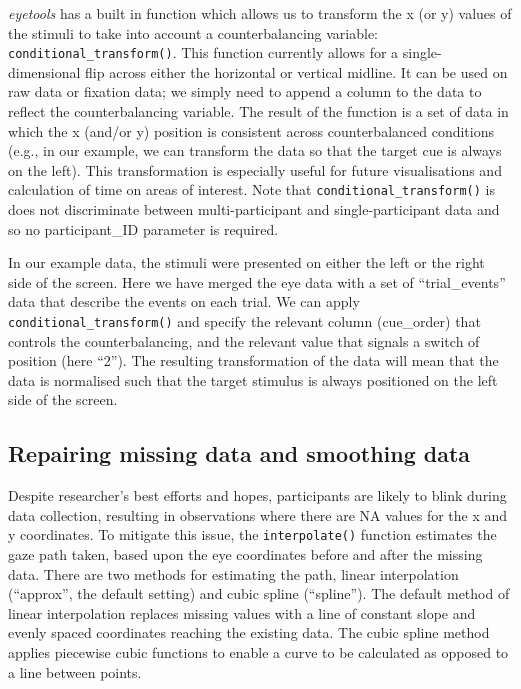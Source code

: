\documentclass[
  man,
  floatsintext,
  longtable,
  nolmodern,
  notxfonts,
  notimes,
  colorlinks=true,linkcolor=blue,citecolor=blue,urlcolor=blue]{apa7}
\begin{document}
\emph{eyetools} has a built in function which allows us to transform the
x (or y) values of the stimuli to take into account a counterbalancing
variable: \texttt{conditional\_transform()}. This function currently
allows for a single-dimensional flip across either the horizontal or
vertical midline. It can be used on raw data or fixation data; we simply
need to append a column to the data to reflect the counterbalancing
variable. The result of the function is a set of data in which the x
(and/or y) position is consistent across counterbalanced conditions
(e.g., in our example, we can transform the data so that the target cue
is always on the left). This transformation is especially useful for
future visualisations and calculation of time on areas of interest. Note
that \texttt{conditional\_transform()} is does not discriminate between
multi-participant and single-participant data and so no participant\_ID
parameter is required.

In our example data, the stimuli were presented on either the left or
the right side of the screen. Here we have merged the eye data with a
set of ``trial\_events'' data that describe the events on each trial. We
can apply \texttt{conditional\_transform()} and specify the relevant
column (cue\_order) that controls the counterbalancing, and the relevant
value that signals a switch of position (here ``2''). The resulting
transformation of the data will mean that the data is normalised such
that the target stimulus is always positioned on the left side of the
screen.

\subsection{Repairing missing data and smoothing
data}\label{repairing-missing-data-and-smoothing-data}

Despite researcher's best efforts and hopes, participants are likely to
blink during data collection, resulting in observations where there are
NA values for the x and y coordinates. To mitigate this issue, the
\texttt{interpolate()} function estimates the gaze path taken, based
upon the eye coordinates before and after the missing data. There are
two methods for estimating the path, linear interpolation (``approx'',
the default setting) and cubic spline (``spline''). The default method
of linear interpolation replaces missing values with a line of constant
slope and evenly spaced coordinates reaching the existing data. The
cubic spline method applies piecewise cubic functions to enable a curve
to be calculated as opposed to a line between points.
\end{document}
